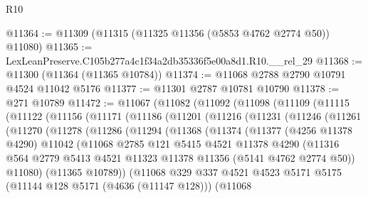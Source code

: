 \begin{lexlean}{R10}
\begin{coremodule}
@11364 := @11309 (@11315 (@11325 @11356 (@5853 @4762 @2774 @50)) @11080)
@11365 := LexLeanPreserve.C105b277a4c1f34a2db35336f5e00a8d1.R10.__rel_29
@11368 := @11300 (@11364 (@11365 @10784))
@11374 := @11068 @2788 @2790 @10791 @4524 @11042 @5176
@11377 := @11301 @2787 @10781 @10790
@11378 := @271 @10789
@11472 := @11067
    (@11082
      (@11092
        (@11098
          (@11109
            (@11115
              (@11122
                (@11156
                  (@11171
                    (@11186
                      (@11201
                        (@11216
                          (@11231
                            (@11246
                              (@11261
                                (@11270
                                  (@11278
                                    (@11286
                                      (@11294
                                        (@11368
                                          (@11374
                                            (@11377
                                              (@4256 @11378 @4290)
                                              @11042
                                              (@11068
                                                @2785
                                                @121
                                                @5415
                                                @4521
                                                @11378
                                                @4290
                                                (@11316
                                                  @564
                                                  @2779
                                                  @5413
                                                  @4521
                                                  @11323
                                                  @11378
                                                  @11356
                                                  (@5141 @4762 @2774 @50))
                                                @11080)
                                              (@11365 @10789))
                                            (@11068
                                              @329
                                              @337
                                              @4521
                                              @4523
                                              @5171
                                              @5175
                                              (@11144 @128 @5171 (@4636 (@11147 @128)))
                                              (@11068

\end{coremodule}
\end{lexlean}
